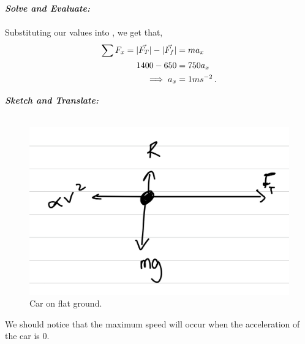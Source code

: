 \begin{subquestions}
\begin{subsubquestions}
\textbf{\textit{Solve and Evaluate:}} \\ \\
Substituting our values into , we get that,
\begin{align}
	\sum F_x = |\vec{F_T}|-|\vec{F_f}| & = ma_x \nonumber \\
	           1400 - 650 & = 750a_x \nonumber \\
	           \implies a_x & = 1 ms^{-2} \,.
\end{align}


\subsubquestion
\textbf{\textit{Sketch and Translate:}} \\ \\
\begin{figure}[H]
	\begin{center}
		\includegraphics[scale=0.25]{../2009/figures/2009q5-2}
		\caption{\label{2009:q5:Sketch3} Car on flat ground.}
	\end{center}
\end{figure}	
We should notice that the maximum speed will occur when the acceleration of the car is 0.





\end{subsubquestions}
\end{subquestions}

